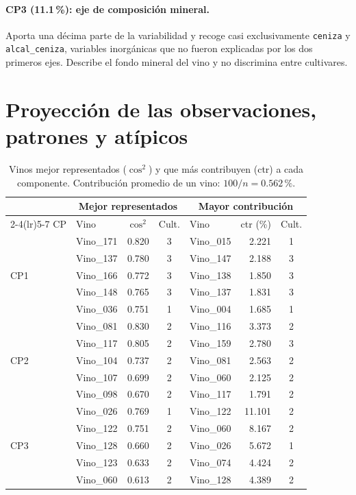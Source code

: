 \documentclass[11pt,a4paper]{article}
\newcommand{\var}[1]{\texttt{#1}}
\begin{document}
\paragraph{CP3 (11.1\,\%): eje de composición mineral.} Aporta una décima parte de la variabilidad y recoge casi exclusivamente \var{ceniza} y \var{alcal\_ceniza}, variables inorgánicas que no fueron explicadas por los dos primeros ejes. Describe el fondo mineral del vino y no discrimina entre cultivares.

\section{Proyección de las observaciones, patrones y atípicos}

\begin{table}[H]
\centering\small
\caption{Vinos mejor representados ($\cos^2$) y que más contribuyen (ctr) a cada componente. Contribución promedio de un vino: $100/n = 0.562\,\%$.}
\begin{tabular}{llrclrc}
\toprule
 & \multicolumn{3}{c}{Mejor representados} & \multicolumn{3}{c}{Mayor contribución} \\
\cmidrule(lr){2-4}\cmidrule(lr){5-7}
CP & Vino & $\cos^2$ & Cult. & Vino & ctr (\%) & Cult. \\
\midrule
\multirow{5}{*}{CP1} & Vino\_171 & 0.820 & 3 & Vino\_015 & 2.221 & 1 \\
 & Vino\_137 & 0.780 & 3 & Vino\_147 & 2.188 & 3 \\
 & Vino\_166 & 0.772 & 3 & Vino\_138 & 1.850 & 3 \\
 & Vino\_148 & 0.765 & 3 & Vino\_137 & 1.831 & 3 \\
 & Vino\_036 & 0.751 & 1 & Vino\_004 & 1.685 & 1 \\
\midrule
\multirow{5}{*}{CP2} & Vino\_081 & 0.830 & 2 & Vino\_116 & 3.373 & 2 \\
 & Vino\_117 & 0.805 & 2 & Vino\_159 & 2.780 & 3 \\
 & Vino\_104 & 0.737 & 2 & Vino\_081 & 2.563 & 2 \\
 & Vino\_107 & 0.699 & 2 & Vino\_060 & 2.125 & 2 \\
 & Vino\_098 & 0.670 & 2 & Vino\_117 & 1.791 & 2 \\
\midrule
\multirow{5}{*}{CP3} & Vino\_026 & 0.769 & 1 & Vino\_122 & 11.101 & 2 \\
 & Vino\_122 & 0.751 & 2 & Vino\_060 & 8.167 & 2 \\
 & Vino\_128 & 0.660 & 2 & Vino\_026 & 5.672 & 1 \\
 & Vino\_123 & 0.633 & 2 & Vino\_074 & 4.424 & 2 \\
 & Vino\_060 & 0.613 & 2 & Vino\_128 & 4.389 & 2 \\

\bottomrule
\end{tabular}
\end{table}
\end{document}
